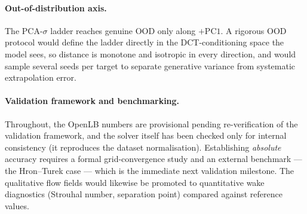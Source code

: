 \paragraph{Out-of-distribution axis.} The PCA-$\sigma$ ladder reaches genuine OOD only along
$+\mathrm{PC1}$. A rigorous OOD protocol would define the ladder directly in the DCT-conditioning space
the model sees, so distance is monotone and isotropic in every direction, and would sample several seeds
per target to separate generative variance from systematic extrapolation error.

\paragraph{Validation framework and benchmarking.} Throughout, the OpenLB numbers are provisional
pending re-verification of the validation framework, and the solver itself has been checked only for
internal consistency (it reproduces the dataset normalisation). Establishing \emph{absolute} accuracy
requires a formal grid-convergence study and an external benchmark --- the Hron--Turek case --- which is
the immediate next validation milestone. The qualitative flow fields would likewise be promoted to
quantitative wake diagnostics (Strouhal number, separation point) compared against reference values.
